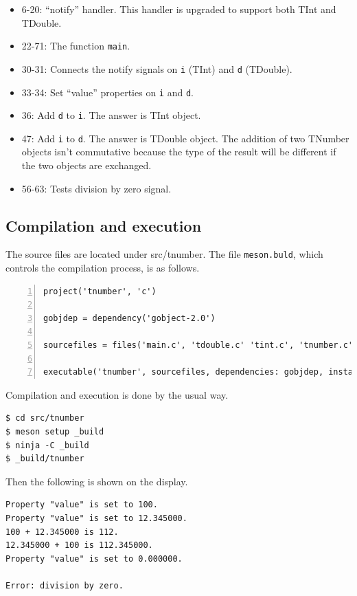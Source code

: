 \begin{itemize}
\tightlist
\item
  6-20: ``notify'' handler. This handler is upgraded to support both
  TInt and TDouble.
\item
  22-71: The function \passthrough{\lstinline!main!}.
\item
  30-31: Connects the notify signals on \passthrough{\lstinline!i!}
  (TInt) and \passthrough{\lstinline!d!} (TDouble).
\item
  33-34: Set ``value'' properties on \passthrough{\lstinline!i!} and
  \passthrough{\lstinline!d!}.
\item
  36: Add \passthrough{\lstinline!d!} to \passthrough{\lstinline!i!}.
  The answer is TInt object.
\item
  47: Add \passthrough{\lstinline!i!} to \passthrough{\lstinline!d!}.
  The answer is TDouble object. The addition of two TNumber objects
  isn't commutative because the type of the result will be different if
  the two objects are exchanged.
\item
  56-63: Tests division by zero signal.
\end{itemize}

\subsection{Compilation and execution}\label{compilation-and-execution}

The source files are located under src/tnumber. The file
\passthrough{\lstinline!meson.buld!}, which controls the compilation
process, is as follows.

\begin{lstlisting}[numbers=left]
project('tnumber', 'c')

gobjdep = dependency('gobject-2.0')

sourcefiles = files('main.c', 'tdouble.c' 'tint.c', 'tnumber.c',)

executable('tnumber', sourcefiles, dependencies: gobjdep, install: false)
\end{lstlisting}

Compilation and execution is done by the usual way.

\begin{lstlisting}
$ cd src/tnumber
$ meson setup _build
$ ninja -C _build
$ _build/tnumber
\end{lstlisting}

Then the following is shown on the display.

\begin{lstlisting}
Property "value" is set to 100.
Property "value" is set to 12.345000.
100 + 12.345000 is 112.
12.345000 + 100 is 112.345000.
Property "value" is set to 0.000000.

Error: division by zero.
\end{lstlisting}

